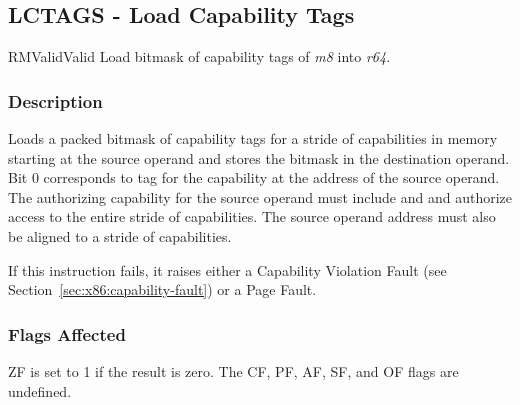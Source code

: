 \clearpage
{}
{}
\subsection*{LCTAGS - Load Capability Tags}

\begin{x86opcodetable}
  {RM}{Valid}{Valid}
  {Load bitmask of capability tags of \emph{m8} into \emph{r64}.}
\end{x86opcodetable}

\begin{x86opentable}
\end{x86opentable}

\subsubsection*{Description}

Loads a packed bitmask of capability tags for a stride of capabilities
in memory starting at the source operand and stores the bitmask in the
destination operand.  Bit 0 corresponds to tag for the capability at
the address of the source operand.  The authorizing capability for the
source operand must include \cappermL{} and \cappermLC{} and authorize
access to the entire stride of capabilities.  The source operand
address must also be aligned to a stride of capabilities.

If this instruction fails, it raises either a Capability Violation
Fault (see Section~\ref{sec:x86:capability-fault}) or a Page Fault.

\subsubsection*{Flags Affected}

ZF is set to 1 if the result is zero.  The CF, PF, AF, SF, and OF
flags are undefined.

